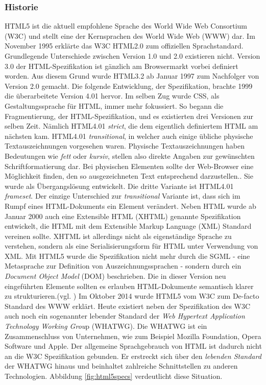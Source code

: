 \subsubsection{Historie} HTML5 ist die aktuell empfohlene Sprache des World Wide Web Consortium (W3C) und stellt eine der Kernsprachen des World Wide Web (WWW) dar. Im November 1995 erklärte das W3C HTML2.0 zum offiziellen Sprachstandard. Grundlegende Unterschiede zwischen Version 1.0 und 2.0 existieren nicht. Version 3.0 der HTML-Spezifikation ist gänzlich am Browsermarkt vorbei definiert worden. Aus diesem Grund wurde HTML3.2 ab Januar 1997 zum Nachfolger von Version 2.0 gemacht. Die folgende Entwicklung, der Spezifikation, brachte 1999 die überarbeitete Version 4.01 hervor. Im selben Zug wurde CSS, als Gestaltungssprache für HTML, immer mehr fokussiert. So begann die Fragmentierung, der HTML-Spezifikation, und es existierten drei Versionen zur selben Zeit. Nämlich HTML4.01 \textit{strict}, die dem eigentlich definiertem HTML am nächsten kam. HTML4.01 \textit{transitional}, in welcher auch einige übliche physische Textauszeichnungen vorgesehen waren. \glqq Physische Textauszeichnungen haben Bedeutungen wie \textit{fett} oder \textit{kursiv}, stellen also direkte Angaben zur gewünschten Schriftformatierung dar. Bei physischen Elementen sollte der Web-Browser eine Möglichkeit finden, den so ausgezeichneten Text entsprechend darzustellen.\grqq{}\cite{SelfHTML20141}. Sie wurde als Übergangslösung entwickelt. Die dritte Variante ist HTML4.01 \textit{frameset}. Der einzige Unterschied zur \textit{transitional} Variante ist, dass sich im Rumpf eines HTML-Dokuments ein Element verändert. Neben HTML wurde ab Januar 2000 auch eine Extensible HTML (XHTML) genannte Spezifikation entwickelt, die HTML mit dem Extensible Markup Language (XML) Standard vereinen sollte. XHTML ist allerdings nicht als eigenständige Sprache zu verstehen, sondern als eine Serialisierungsform für HTML unter Verwendung von XML. Mit HTML5 wurde die Spezifikation nicht mehr durch die SGML - eine Metasprache zur Definition von Auszeichnungssprachen - sondern durch ein \textit{Document Object Model} (DOM) beschrieben. Die in dieser Version neu eingeführten Elemente sollten es erlauben HTML-Dokumente semantisch klarer zu strukturieren.(vgl. \cite[S.20ff]{MunzHTML2012}) Im Oktober 2014 wurde HTML5 vom W3C zum De-facto Standard des WWW erklärt. Heute existiert neben der Spezifikation des W3C auch noch ein sogenannter \glqq lebender Standard\grqq{} der \textit{Web Hypertext Application Technology Working Grou}p (WHATWG). Die WHATWG ist ein Zusammenschluss von Unternehmen, wie zum Beispiel Mozilla Foundation, Opera Software und Apple. Der allgemeine Sprachgebrauch von HTML ist dadurch nicht an die W3C Spezifikation gebunden. Er erstreckt sich über den \textit{lebenden Standard} der WHATWG hinaus und beinhaltet zahlreiche Schnittstellen zu anderen Technologien. Abbildung \ref{fig:html5specs} verdeutlicht diese Situation.
	
